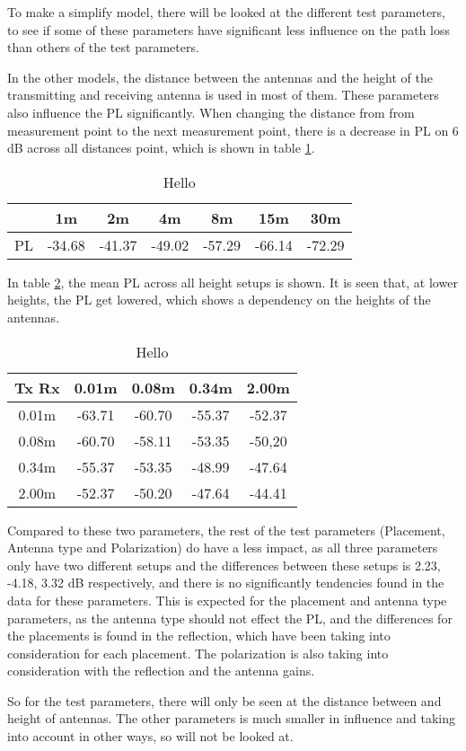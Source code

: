 To make a simplify model, there will be looked at the different test parameters, to see if some of these parameters have significant less influence on the path loss than others of the test parameters.

In the other models, the distance between the antennas and the height of the transmitting and receiving antenna is used in most of them. These parameters also influence the PL significantly. When changing the distance from from measurement point to the next measurement point, there is a decrease in PL on 6 dB across all distances point, which is shown in table \ref{App1}.

\begin{table}

\begin{tabular}{|c|c|c|c|c|c|c|}
\hline
   & 1m & 2m & 4m & 8m & 15m & 30m\\
\hline
PL & -34.68 & -41.37 & -49.02 & -57.29 & -66.14 & -72.29 \\
\hline

\end{tabular}
\label{App1}
\caption{Hello}
\end{table}

In table \ref{App2}, the mean PL across all height setups is shown. It is seen that, at lower heights, the PL get lowered, which shows a dependency on the heights of the antennas.

\begin{table}
\begin{tabular}{|c|c|c|c|c|}
\hline
Tx Rx & 0.01m & 0.08m & 0.34m & 2.00m \\
\hline
0.01m & -63.71 & -60.70 & -55.37 & -52.37\\
\hline
0.08m & -60.70 & -58.11 & -53.35 & -50,20\\
\hline
0.34m & -55.37 & -53.35 & -48.99 & -47.64\\
\hline
2.00m & -52.37 & -50.20 & -47.64 & -44.41\\
\hline
\end{tabular}
\caption{Hello}
\label{App2}
\end{table}

Compared to these two parameters, the rest of the test parameters (Placement, Antenna type and Polarization) do have a less impact, as all three parameters only have two different setups and the differences between these setups is 2.23, -4.18, 3.32 dB respectively, and there is no significantly tendencies found in the data for these parameters. This is expected for the placement and antenna type parameters, as the antenna type should not effect the PL, and the differences for the placements is found in the reflection, which have been taking into consideration for each placement. The polarization is also taking into consideration with the reflection and the antenna gains.

So for the test parameters, there will only be seen at the distance between and height of antennas. The other parameters is much smaller in influence and taking into account in other ways, so will not be looked at.
